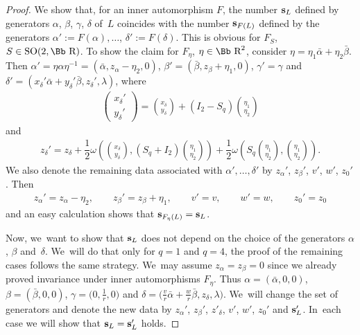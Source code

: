 \documentclass[pdftex]{sigma}
\newcommand\RR{{\mbox{\Bb R}}}
\newcommand\bs{\textbf{{\rm \textbf{s}}}}
\newcommand{\SO}{\mathop{{\rm SO}}}
\numberwithin{equation}{section}
\begin{document}
\begin{proof}
We show that, for an inner automorphism $F$, the number $\bs_L$ defined by generators $\alpha$, $\beta$, $\gamma$, $\delta$ of~$L$ coincides with the number $\bs_{F(L)}$ defined by the generators $\alpha':=F(\alpha),\dots$, \mbox{$\delta':=F(\delta)$}. This is obvious for $F_S$, $S\in\SO(2,\RR)$.
To show the claim for $F_\eta$, $\eta\in\RR^2$, consider $\eta=\eta_1\bar\alpha+\eta_2\bar\beta$.
Then $\alpha'=\eta\alpha\eta^{-1}=(\bar\alpha,z_\alpha-\eta_2,0)$, $\beta'=(\bar\beta,z_\beta+\eta_1,0)$,
$\gamma'=\gamma$ and $\delta'=(x_\delta'\bar \alpha+y_\delta'\bar \beta,z_\delta',\lambda)$, where
\begin{gather*}
\begin{pmatrix}x_\delta'\\y_\delta'\end{pmatrix}
= {x_\delta \choose y_\delta} +(I_2-S_q){\eta_1 \choose \eta_2}\end{gather*}
and
\begin{gather*}
z_\delta'=z_\delta+\dfrac{1}{2}\omega\left(\!{x_\delta\choose y_\delta},
(S_q+I_2){\eta_1\choose \eta_2}\!\right)
+\dfrac{1}{2}\omega\left( S_q{\eta_1\choose \eta_2}, {\eta_1\choose \eta_2}\! \right)\!.
\end{gather*}
We also denote the remaining data associated with $\alpha',\dots,\delta'$ by $z_\alpha'$, $z_\beta'$, $v'$, $w'$, $z_0'$. Then
\begin{gather*}
z_\alpha'=z_\alpha-\eta_2,\qquad
z_\beta'=z_\beta+\eta_1,\qquad
v'=v,\qquad w'=w,\qquad z_0'=z_0
\end{gather*}
and an easy calculation shows that $\bs_{F_\eta(L)}=\bs_L$.

Now, we~want to show that $\bs_L$ does not depend on the choice of the generators $\alpha$, $\beta$ and~$\delta$. We~will do that only for $q=1$ and $q=4$, the proof of the remaining cases follows the same strategy. We~may assume $z_\alpha=z_\beta=0$ since we already proved invariance under inner automorphisms $F_\eta$. Thus $\alpha=(\bar\alpha,0,0)$, $\beta=(\bar\beta,0,0)$, $\gamma=\big(0,\frac{1}{r},0\big)$ and $\delta=\big(\frac{v}{r}\bar\alpha+\frac{w}{r}\bar\beta,z_\delta,\lambda\big)$. We~will change the set of generators and denote the new data by $z_\alpha'$, $z_\beta'$, $z'_\delta$, $v'$, $w'$, $z_0'$ and $\bs_L'$. In~each case we will show that $\bs_L=\bs_L'$ holds.


\end{proof}
\end{document}
